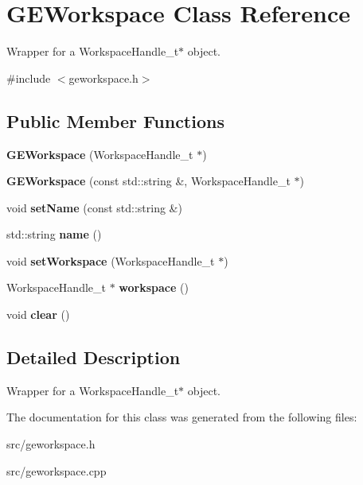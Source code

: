 \hypertarget{class_g_e_workspace}{}\section{G\+E\+Workspace Class Reference}
\label{class_g_e_workspace}


Wrapper for a Workspace\+Handle\+\_\+t$\ast$ object.  




{\ttfamily \#include $<$geworkspace.\+h$>$}

\subsection*{Public Member Functions}
\begin{DoxyCompactItemize}
\item 
\mbox{\label{class_g_e_workspace_aca53a033e0dbba102137830a59947c27}} 
{\bfseries G\+E\+Workspace} (Workspace\+Handle\+\_\+t $\ast$)
\item 
\mbox{\label{class_g_e_workspace_a04fa62c1f18e7ea5beb56c004731616f}} 
{\bfseries G\+E\+Workspace} (const std\+::string \&, Workspace\+Handle\+\_\+t $\ast$)
\item 
\mbox{\label{class_g_e_workspace_aeea0a0abd2ff8684d39aca1c4fd69405}} 
void {\bfseries set\+Name} (const std\+::string \&)
\item 
\mbox{\label{class_g_e_workspace_a679d97c4b6e78caafb74dd48161b96f1}} 
std\+::string {\bfseries name} ()
\item 
\mbox{\label{class_g_e_workspace_a97523ad7af7201388ba471ecc4086e72}} 
void {\bfseries set\+Workspace} (Workspace\+Handle\+\_\+t $\ast$)
\item 
\mbox{\label{class_g_e_workspace_a95451d82decc36a4bc260d0aee7e8915}} 
Workspace\+Handle\+\_\+t $\ast$ {\bfseries workspace} ()
\item 
\mbox{\label{class_g_e_workspace_ab770508d4d56793d8c99b14714608c80}} 
void {\bfseries clear} ()
\end{DoxyCompactItemize}


\subsection{Detailed Description}
Wrapper for a Workspace\+Handle\+\_\+t$\ast$ object. 

The documentation for this class was generated from the following files\+:\begin{DoxyCompactItemize}
\item 
src/geworkspace.\+h\item 
src/geworkspace.\+cpp\end{DoxyCompactItemize}
